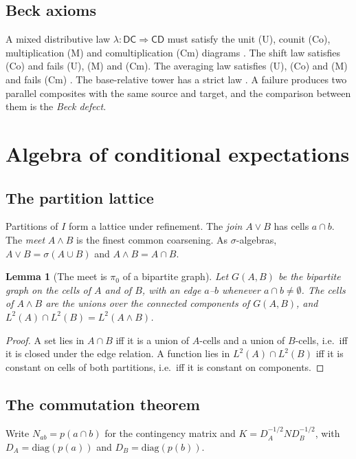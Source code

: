 \documentclass[11pt]{article}
\newtheorem{lemma}[theorem]{Lemma}
\theoremstyle{definition}
\newcommand{\D}{\mathsf D}
\newcommand{\C}{\mathsf C}
\begin{document}
\subsection{Beck axioms}
A mixed distributive law $\lambda\colon\D\C\Rightarrow\C\D$ must satisfy the unit (U), counit (Co), multiplication (M) and
comultiplication (Cm) diagrams \cite[Def.~2.1]{Tower}. The shift law satisfies (Co) and fails (U), (M) and (Cm). The averaging law
satisfies (U), (Co) and (M) and fails (Cm) \cite[Thms.~8.3, 8.6, 8.7]{Tower}. The base-relative tower has a strict law
\cite[Thm.~9.8]{Tower}. A failure produces two parallel composites with the same source and target, and the comparison between them
is the \emph{Beck defect}.

\section{Algebra of conditional expectations}\label{sec:algebra}

\subsection{The partition lattice}
Partitions of $I$ form a lattice under refinement. The \emph{join} $A\vee B$ has cells $a\cap b$. The \emph{meet} $A\wedge B$ is the
finest common coarsening. As $\sigma$-algebras, $A\vee B=\sigma(A\cup B)$ and $A\wedge B=A\cap B$.

\begin{lemma}[The meet is $\pi_0$ of a bipartite graph]\label{lem:meet}
Let $G(A,B)$ be the bipartite graph on the cells of $A$ and of $B$, with an edge $a$--$b$ whenever $a\cap b\ne\emptyset$. The cells of
$A\wedge B$ are the unions over the connected components of $G(A,B)$, and $L^2(A)\cap L^2(B)=L^2(A\wedge B)$.
\end{lemma}
\begin{proof}
A set lies in $A\cap B$ iff it is a union of $A$-cells and a union of $B$-cells, i.e.\ iff it is closed under the edge relation. A
function lies in $L^2(A)\cap L^2(B)$ iff it is constant on cells of both partitions, i.e.\ iff it is constant on components.
\end{proof}

\subsection{The commutation theorem}
Write $N_{ab}=p(a\cap b)$ for the contingency matrix and $K=D_A^{-1/2}ND_B^{-1/2}$, with $D_A=\mathrm{diag}(p(a))$ and
$D_B=\mathrm{diag}(p(b))$.
\end{document}
